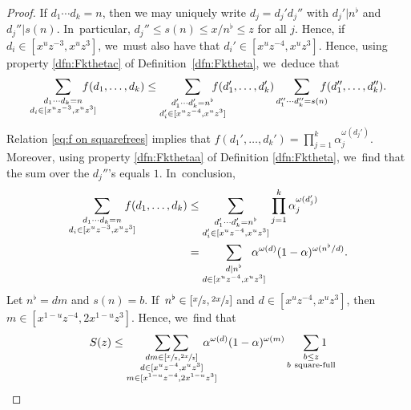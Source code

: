 \documentclass[10pt]{amsart}
\theoremstyle{plain}
\theoremstyle{definition}
\begin{document}
\begin{proof}
If $d_1\cdots d_k=n$, then we may uniquely write $d_j=d_j'd_j''$ with $d_j'|n^\flat$ and $d_j''|s(n)$. In~particular, $d_j''\le s(n)\le x/n^\flat\le z$ for all $j$. Hence, if $d_i\in[x^u z^{-3},x^uz^3]$, we~must also have that $d_i'\in[x^uz^{-4},x^uz^3]$. Hence, using property \eqref{dfn:Fkthetac} of Definition~\ref{dfn:Fktheta}, we~deduce that
\[
\sum_{\substack{d_1\cdots d_k = n \\ d_i\in[x^uz^{-3}, x^uz^3] }} \hspace*{-5mm}f(d_1,\dots,d_k)
\le \sum_{\substack{d_1'\cdots d_k' = n^\flat \\ d_i'\in[x^uz^{-4}, x^uz^3] }}\hspace*{-5mm} f(d_1',\dots,d_k')
\sum_{d_1''\cdots d_k'' = s(n)}\hspace*{-3mm} f(d_1'',\dots,d_k'').
\]
Relation \eqref{eq:f on squarefrees} implies that $f(d_1',\dots,d_k') = \prod_{j=1}^k \alpha_j^{\omega(d_j')}$. Moreover, using property \eqref{dfn:Fkthetaa} of Definition \ref{dfn:Fktheta}, we~find that the sum over the $d_j''$'s equals $1$. In~conclusion,
\begin{align*}
\sum_{\substack{d_1\cdots d_k = n \\ d_i\in[x^uz^{-3}, x^uz^3] }}\hspace*{-4mm} f(d_1,\dots,d_k)
&\le \sum_{\substack{d_1'\cdots d_k' = n^\flat \\ d_i'\in[x^uz^{-4}, x^uz^3] }} \prod_{j=1}^k \alpha_j^{\omega(d_j')} \\
&= \sum_{\substack{d| n^\flat \\ d\in[x^uz^{-4}, x^uz^3] }} \hspace*{-5mm} \alpha^{\omega(d)} (1-\alpha)^{\omega(n^\flat/d)}.
\end{align*}
Let $n^\flat=dm$ and $s(n)=b$. If~$n^\flat\in[\sfrac{x}{z},\sfrac{2x}{z}]$ and $d\in[x^uz^{-4},x^uz^3]$, then $m\in [x^{1-u}z^{-4},2x^{1-u}z^3]$. Hence, we~find that
\begin{equation}
\label{eq:bound in terms of S1 and S2}
\begin{aligned}
S(z) &\le \mathop{\sum\sum}_{\substack{dm \in[\sfrac{x}{z},\sfrac{2x}{z}] \\ d\in[x^uz^{-4}, x^uz^3] \\ m\in[x^{1-u}z^{-4},2x^{1-u}z^3] }}\hspace*{-5mm}
\alpha^{\omega(d)} (1-\alpha)^{\omega(m)} \sum_{\substack{b\le z \\ b\ \text{square-full}}}\hspace*{-5mm} 1\\

\end{aligned}
\end{equation}
\end{proof}
\end{document}
